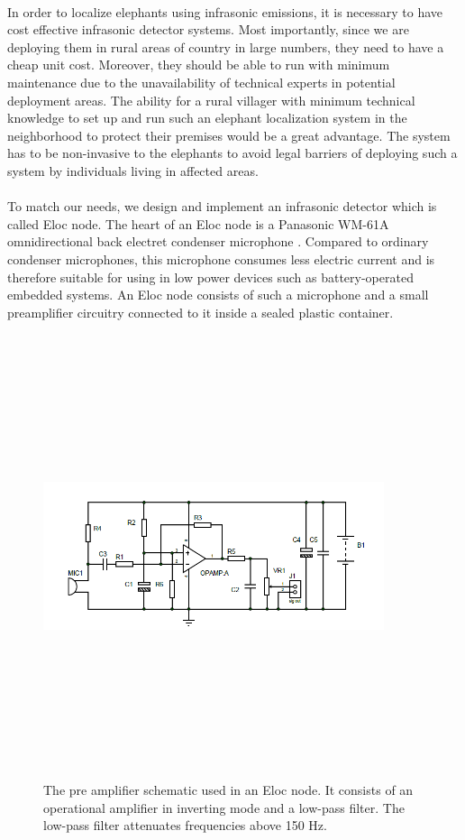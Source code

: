 \documentclass[12pt]{article}
\numberwithin{figure}{section}
\numberwithin{table}{section}
\begin{document}
\paragraph{}
In order to localize elephants using infrasonic emissions, it is necessary to have cost effective infrasonic detector systems. Most importantly, since we are deploying them in rural areas of country in large numbers, they need to have a cheap unit cost. Moreover, they should be able to run with minimum maintenance due to the unavailability of technical experts in potential deployment areas. The ability for a rural villager with minimum technical knowledge to set up and run such an elephant localization system in the neighborhood to protect their premises would be a great advantage. The system has to be non-invasive to the elephants to avoid legal barriers of deploying such a system by individuals living in affected areas.

\paragraph{}
To match our needs, we design and implement an infrasonic detector which is called Eloc node. The heart of an Eloc node is a Panasonic WM-61A omnidirectional back electret condenser microphone \cite{15}. Compared to ordinary condenser microphones, this microphone consumes less electric current and is therefore suitable for using in low power devices such as battery-operated embedded systems. An Eloc node consists of such a microphone and a small preamplifier circuitry connected to it inside a sealed plastic container.

\begin{figure}[H]
\centering
\includegraphics[width=10cm,height=13cm,keepaspectratio]{circuit.png}
\caption[Circuit diagram on an Elocate node]{The pre amplifier schematic used in an Eloc node.
It consists of an operational amplifier in inverting mode and
a low-pass filter. The low-pass filter attenuates frequencies
above 150 Hz.}
\label{image:circuit}
\end{figure}
\end{document}
